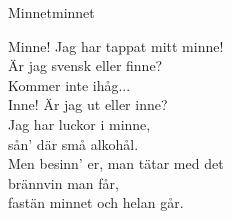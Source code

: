 \begin{song}{Minnet}{minnet}
\begin{vers}

Minne! Jag har tappat mitt minne!\\
Är jag svensk eller finne?\\
Kommer inte ihåg...\\
Inne! Är jag ut eller inne?\\
Jag har luckor i minne,\\
sån' där små alkohål.\\
Men besinn' er, man tätar med det\\
brännvin man får,\\
fastän minnet och helan går.\\
\end{vers}
\end{song}

